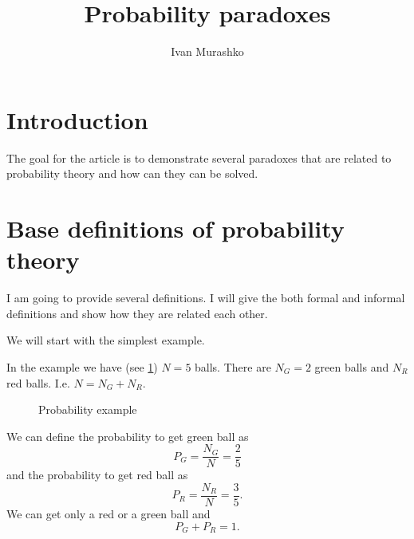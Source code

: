 \documentclass[14pt,a4paper]{article}
\title{Probability paradoxes}
\author{Ivan Murashko}
\date{}
\begin{document}
\maketitle
\tableofcontents

\section*{Introduction}
The goal for the article is to demonstrate several paradoxes that are
related to probability theory and how can they can be solved.

\section{Base definitions of probability theory}
I am going to provide several definitions. I will give the both formal
and informal definitions and show how they are related each other.

We will start with the simplest example. 
\begin{example}
In the example we have (see \cref{fig:simpleprobability}) $N=5$ balls.
There are $N_G = 2$ green balls and $N_R$ red balls. I.e. $N = N_G +
N_R$.  
\begin{figure}[H]
  \centering
  \caption{Probability example}
  \label{fig:simpleprobability}
\end{figure}

We can define the probability to get green ball as
\[
P_G = \frac{N_G}{N} = \frac{2}{5}
\]
and the probability to get red ball as
\[
P_R = \frac{N_R}{N} = \frac{3}{5}.
\]
We can get only a red or a green ball and 
\[
P_G + P_R = 1.
\]
\end{example}
\end{document}
